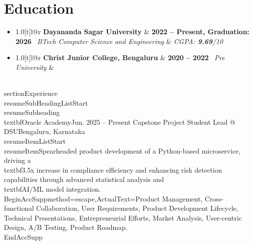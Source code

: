 \documentclass[a4paper]{extarticle}
\makeatletter
\renewcommand\normalsize{\fontsize{10}{11.8}\selectfont}
\newcommand{\resumeItem}[1]{
  \item\normalsize{
    {#1 \vspace{-2pt}}
  }
}
\newcommand{\resumeSubheading}[4]{
  \vspace{-2pt}\item
    \begin{tabular*}{1.0\textwidth}[t]{l@{\extracolsep{\fill}}r}
      \textbf{#1} & \textbf{\small #2} \
      \textit{\small#3} & \textit{\small #4} \
    \end{tabular*}\vspace{-7pt}
}
\newcommand{\resumeSubHeadingListStart}{\begin{itemize}[leftmargin=0.0in, label={}]}
\newcommand{\resumeSubHeadingListEnd}{\end{itemize}}
\newcommand{\resumeItemListStart}{\begin{itemize}}
\makeatother
\begin{document}
\vspace{-0.2 in}    
\section{Education}
  \resumeSubHeadingListStart
    \resumeSubheading
      {Dayananda Sagar University}{2022 -- Present, Graduation: 2026}
      {BTech Computer Science and Engineering}{CGPA: \textbf{9.69}/10}
    \resumeSubheading
      {Christ Junior College, Bengaluru}{2020 -- 2022}
      {Pre University}{}
  \resumeSubHeadingListEnd

\\section{Experience}
\\resumeSubHeadingListStart
    \\resumeSubheading
    {\\textbf{Oracle Academy}}{Jun. 2025 -- Present}
    {Capstone Project Student Lead @ DSU}{Bengaluru, Karnataka}
    \\resumeItemListStart
        \\resumeItem{Spearheaded product development of a Python-based microservice, driving a \\textbf{3.5x} increase in compliance efficiency and enhancing risk detection capabilities through advanced statistical analysis and \\textbf{AI/ML model} integration.}
        \\BeginAccSupp{method=escape,ActualText={Product Management, Cross-functional Collaboration, User Requirements, Product Development Lifecycle, Technical Presentations, Entrepreneurial Efforts, Market Analysis, User-centric Design, A/B Testing, Product Roadmap.}}\hspace{0pt}\\EndAccSupp{}
\end{document}
